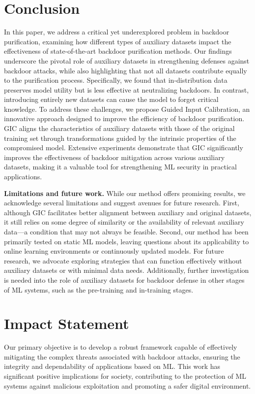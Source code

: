\section{Conclusion}
In this paper, we address a critical yet underexplored problem in backdoor purification, examining how different types of auxiliary datasets impact the effectiveness of state-of-the-art backdoor purification methods. Our findings underscore the pivotal role of auxiliary datasets in strengthening defenses against backdoor attacks, while also highlighting that not all datasets contribute equally to the purification process. Specifically, we found that in-distribution data preserves model utility but is less effective at neutralizing backdoors. In contrast, introducing entirely new datasets can cause the model to forget critical knowledge. 
%
To address these challenges, we propose Guided Input Calibration, an innovative approach designed to improve the efficiency of backdoor purification. GIC aligns the characteristics of auxiliary datasets with those of the original training set through transformations guided by the intrinsic properties of the compromised model. Extensive experiments demonstrate that GIC significantly improves the effectiveness of backdoor mitigation across various auxiliary datasets, making it a valuable tool for strengthening ML security in practical applications.


\textbf{Limitations and future work.} While our method offers promising results, we acknowledge several limitations and suggest avenues for future research. First, although GIC facilitates better alignment between auxiliary and original datasets, it still relies on some degree of similarity or the availability of relevant auxiliary data—a condition that may not always be feasible. Second, our method has been primarily tested on static ML models, leaving questions about its applicability to online learning environments or continuously updated models. For future research, we advocate exploring strategies that can function effectively without auxiliary datasets or with minimal data needs. Additionally, further investigation is needed into the role of auxiliary datasets for backdoor defense in other stages of ML systems, such as the pre-training and in-training stages.

\vspace{-0.1in}
\section*{Impact Statement}
Our primary objective is to develop a robust framework capable of effectively mitigating the complex threats associated with backdoor attacks, ensuring the integrity and dependability of applications based on ML. This work has significant positive implications for society, contributing to the protection of ML systems against malicious exploitation and promoting a safer digital environment.